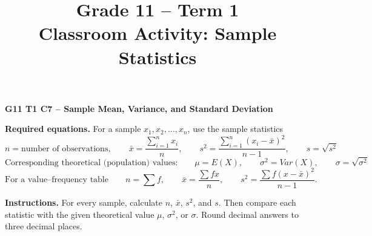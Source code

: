 \makeatletter
{}
\makeatother



\title{Grade 11 -- Term 1 \\ Classroom Activity: Sample Statistics}
\author{}
\date{}

\pagestyle{empty}


\newcommand{\SolutionStage}[2]{%
	\Needspace{6\baselineskip}%
	\subsection{#2}%
}


	
	
	
	\vspace*{-15mm}
	
	\begin{center}
		{\large\bfseries G11 T1 C7 -- Sample Mean, Variance, and Standard Deviation}
	\end{center}
	
	\vspace{-3mm}
	
	\noindent
	\textbf{Required equations.}
	For a sample $x_1,x_2,\ldots,x_n$, use the sample statistics
	\[
	\boxed{
		n=\text{number of observations},\qquad
		\bar{x}=\frac{\sum_{i=1}^{n}x_i}{n},\qquad
		s^2=\frac{\sum_{i=1}^{n}(x_i-\bar{x})^2}{n-1},\qquad
		s=\sqrt{s^2}
	}
	\]
	\[
	\textrm{Corresponding theoretical (population) values:}
	\qquad
	\boxed{
		\mu=E(X),\qquad
		\sigma^2=Var(X),\qquad
		\sigma=\sqrt{\sigma^2}
	}
	\]
	\[
	\textrm{For a value--frequency table}
	\qquad
	n=\sum f,
	\qquad
	\bar{x}=\frac{\sum fx}{n},
	\qquad
	s^2=\frac{\sum f(x-\bar{x})^2}{n-1}.
	\]
	
	\medskip
	\noindent
	\textbf{Instructions.} For every sample, calculate $n$, $\bar{x}$, $s^2$, and
	$s$. Then compare each statistic with the given theoretical value
	$\mu$, $\sigma^2$, or $\sigma$. Round decimal answers to three decimal places.
	
